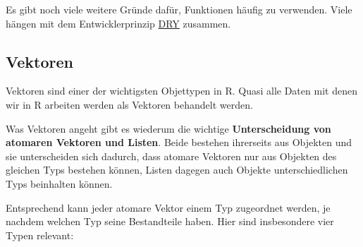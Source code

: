 \documentclass[]{tufte-book}
\begin{document}
Es gibt noch viele weitere Gründe dafür, Funktionen häufig zu verwenden.
Viele hängen mit dem Entwicklerprinzip
\href{https://de.wikipedia.org/wiki/Don\%E2\%80\%99t_repeat_yourself}{DRY}
zusammen.

\subsection{Vektoren}\label{vektoren}

Vektoren sind einer der wichtigsten Objettypen in R. Quasi alle Daten
mit denen wir in R arbeiten werden als Vektoren behandelt werden.

Was Vektoren angeht gibt es wiederum die wichtige \textbf{Unterscheidung
von atomaren Vektoren und Listen}. Beide bestehen ihrerseits aus
Objekten und sie unterscheiden sich dadurch, dass atomare Vektoren nur
aus Objekten des gleichen Typs bestehen können, Listen dagegen auch
Objekte unterschiedlichen Typs beinhalten können.

Entsprechend kann jeder atomare Vektor einem Typ zugeordnet werden, je
nachdem welchen Typ seine Bestandteile haben. Hier sind insbesondere
vier Typen relevant:
\end{document}
